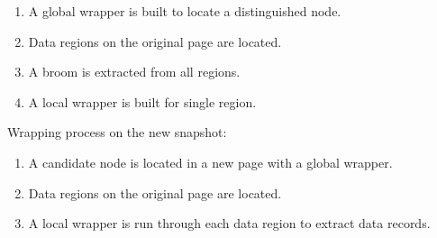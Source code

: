 \begin{enumerate}
	\item A global wrapper is built to locate a distinguished node.
	\item Data regions on the original page are located.
	\item A broom is extracted from all regions.
	\item A local wrapper is built for single region.
\end{enumerate}

Wrapping process on the new snapshot:

\begin{enumerate}
	\item A candidate node is located in a new page with a global wrapper.
	\item Data regions on the original page are located.
	\item A local wrapper is run through each data region to extract data records.
\end{enumerate}







